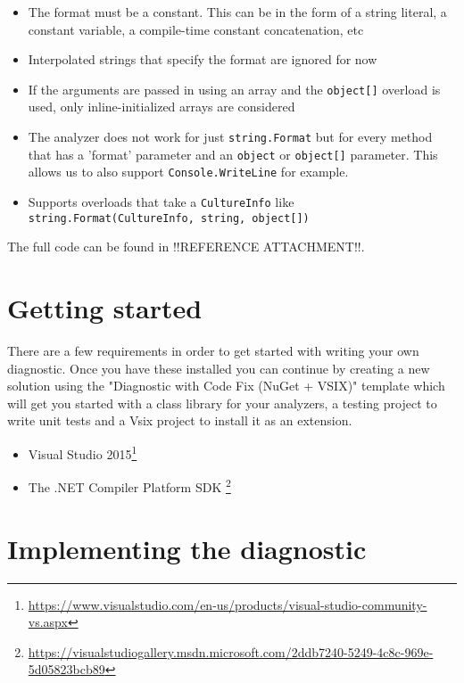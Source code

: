 \begin{itemize}
\item The format must be a constant. This can be in the form of a string literal, a constant variable, a compile-time constant concatenation, etc
\item Interpolated strings that specify the format are ignored for now
\item If the arguments are passed in using an array and the \texttt{object[]} overload is used, only inline-initialized arrays are considered
\item The analyzer does not work for just \texttt{string.Format} but for every method that has a 'format' parameter and an \texttt{object} or \texttt{object[]} parameter. This allows us to also support \texttt{Console.WriteLine} for example.
\item Supports overloads that take a \texttt{CultureInfo} like \texttt{string.Format(CultureInfo, string, object[])}
\end{itemize}

The full code can be found in !!REFERENCE ATTACHMENT!!.


\section{Getting started}
\label{sec:diagnostic-getting-started}

There are a few requirements in order to get started with writing your own diagnostic. Once you have these installed you can continue by creating a new solution using the "Diagnostic with Code Fix (NuGet + VSIX)" template which will get you started with a class library for your analyzers, a testing project to write unit tests and a Vsix project to install it as an extension.

\begin{itemize}
\item Visual Studio 2015\footnote{\url{https://www.visualstudio.com/en-us/products/visual-studio-community-vs.aspx}}
\item The .NET Compiler Platform SDK \footnote{\url{https://visualstudiogallery.msdn.microsoft.com/2ddb7240-5249-4c8c-969e-5d05823bcb89}}
\end{itemize}

\section{Implementing the diagnostic}
\label{sec:diagnostic-implementation}

